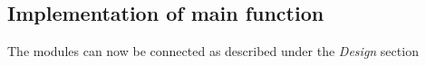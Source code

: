 \subsection{Implementation of main function}

The modules can now be connected as described under the \emph{Design} section  